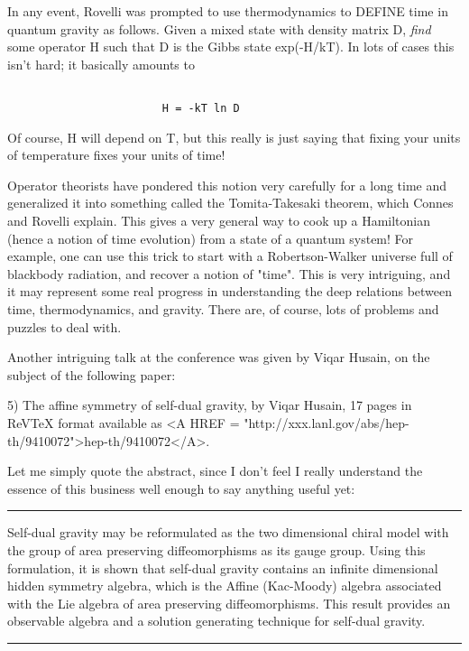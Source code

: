 In any event, Rovelli was prompted to use thermodynamics to DEFINE time
in quantum gravity as follows.  Given a mixed state with density matrix
D, \emph{find} some operator H such that D is the Gibbs state exp(-H/kT).
In lots of cases this isn't hard; it basically amounts to 


\begin{verbatim}

                        H = -kT ln D
\end{verbatim}
    

Of course, H will depend on T, but this really is just saying that
fixing your units of temperature fixes your units of time!

Operator theorists have pondered this notion very carefully for a long
time and generalized it into something called the Tomita-Takesaki
theorem, which Connes and Rovelli explain.  This gives a very general
way to cook up a Hamiltonian (hence a notion of time evolution) from a
state of a quantum system!  For example, one can use this trick to start
with a Robertson-Walker universe full of blackbody radiation, and
recover a notion of "time".  This is very intriguing, and it may
represent some real progress in understanding the deep relations between
time, thermodynamics, and gravity.  There are, of course, lots of
problems and puzzles to deal with.  

Another intriguing talk at the conference was given by Viqar Husain, on
the subject of the following paper:

5) The affine symmetry of self-dual gravity, by Viqar Husain, 17 pages
in ReVTeX format available as <A HREF = "http://xxx.lanl.gov/abs/hep-th/9410072">hep-th/9410072</A>.  

Let me simply quote the abstract, since I don't feel I really understand
the essence of this business well enough to say anything useful yet:

\par\noindent\rule{\textwidth}{0.4pt}
Self-dual gravity may be reformulated as the two dimensional chiral
model with the group of area preserving diffeomorphisms as its gauge
group.  Using this formulation, it is shown that self-dual gravity
contains an infinite dimensional hidden symmetry algebra, which is the
Affine (Kac-Moody) algebra associated with the Lie algebra of area
preserving diffeomorphisms.  This result provides an observable algebra
and a solution generating technique for self-dual gravity.
\par\noindent\rule{\textwidth}{0.4pt}


